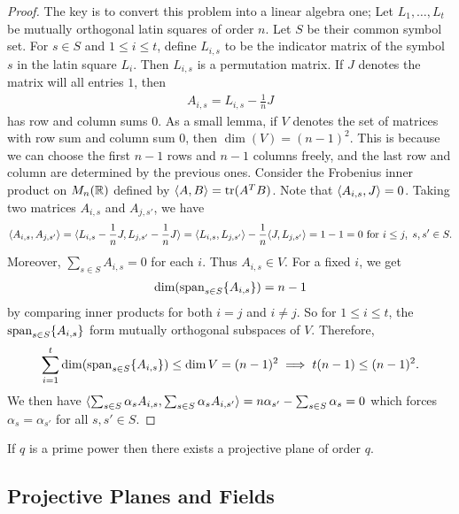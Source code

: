 \begin{proof}
    The key is to convert this problem into a linear algebra one; Let $L_{1},\ldots,L_{t}$ be mutually orthogonal latin squares of order $n$. Let $S$ be their common symbol set. For $s \in S$ and $1 \leq i \leq t$, define $L_{i,s}$ to be the indicator matrix of the symbol $s$ in the latin square $L_{i}$. Then $L_{i,s}$ is a permutation matrix. If $J$ denotes the matrix will all entries $1$, then
    \begin{align}
        A_{i,s} = L_{i,s} - \frac{1}{n} J
    \end{align}
    has row and column sums $0$. As a small lemma, if $V$ denotes the set of matrices with row sum and column sum $0$, then $\dim(V) = (n-1)^{2}$. This is because we can choose the first $n-1$ rows and $n-1$ columns freely, and the last row and column are determined by the previous ones. Consider the Frobenius inner product on $M_{n}(\mathbb{R})$ defined by $\langle A,B\rangle = \operatorname{tr}(A^{T}B)$. Note that $\langle A_{i,s},J\rangle = 0$. Taking two matrices $A_{i,s}$ and $A_{j,s'}$, we have
    \begin{align}
        \langle A_{i,s},A_{j,s'}\rangle = \langle L_{i,s} - \frac{1}{n}J, L_{j,s'} - \frac{1}{n}J\rangle = \langle L_{i,s},L_{j,s'}\rangle - \frac{1}{n}\langle J,L_{j,s'}\rangle = 1-1 = 0 \text{ for } i \leq j,\; s,s' \in S.
    \end{align}
    Moreover, $\sum_{s \in S} A_{i,s} = 0$ for each $i$. Thus $A_{i,s} \in V$. For a fixed $i$, we get
    \begin{align}
        \dim (\operatorname{span}_{s \in S} \{A_{i,s}\}) = n-1
    \end{align}
    by comparing inner products for both $i = j$ and $i \neq j$. So for $1 \leq i \leq t$, the $\operatorname{span}_{s \in S} \{A_{i,s}\}$ form mutually orthogonal subspaces of $V$. Therefore,
    \begin{align}
        \sum_{i=1}^{t} \dim(\operatorname{span}_{s \in S} \{A_{i,s}\}) \leq \dim V = (n-1)^{2} \implies t(n-1) \leq (n-1)^{2}.
    \end{align}
    We then have $\langle\sum_{s \in S} \alpha_{s} A_{i,s}, \sum_{s \in S} \alpha_{s} A_{i,s'}\rangle = n\alpha_{s'} - \sum_{s \in S} \alpha_{s} = 0$ which forces $\alpha_{s} = \alpha_{s'}$ for all $s,s' \in S$.
\end{proof}

\begin{theorem}
    If $q$ is a prime power then there exists a projective plane of order $q$.
\end{theorem}

\subsection{Projective Planes and Fields}

